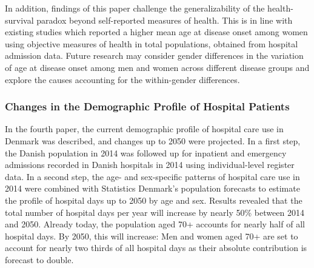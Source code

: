 In addition, findings of this paper challenge the generalizability of the 
health-survival paradox beyond self-reported measures of health. This is in 
line with existing studies which reported a higher mean age at disease onset 
among women using objective measures of health in total populations, obtained 
from hospital admission data.\citep{lynch2007use,karampampa2013trends,
westergaard2019population} Future research may consider gender differences 
in the variation of age at disease onset among men and women across 
different disease groups and explore the causes accounting for the 
within-gender differences.\\


\subsubsection*{Changes in the Demographic Profile of Hospital Patients}

In the fourth paper, the current demographic profile of hospital 
care use in Denmark was described, and changes up to 2050 were projected. 
In a first step, the Danish population in 2014 was followed up for 
inpatient and emergency admissions recorded in Danish hospitals in 
2014 using individual-level register data. In a second step, the age- 
and sex-specific patterns of hospital care use in 2014 were combined 
with Statistics Denmark's population forecasts to estimate the profile 
of hospital days up to 2050 by age and sex. Results revealed that 
the total number of hospital days per year will increase by nearly 
50\% between 2014 and 2050. Already today, the population aged 70+ 
accounts for nearly half of all hospital days. By 2050, this will 
increase: Men and women aged 70+ are set to account for nearly two 
thirds of all hospital days as their absolute contribution is forecast 
to double.

